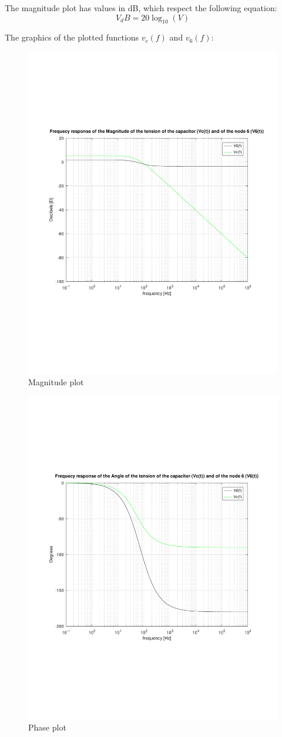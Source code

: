 The magnitude plot has values in dB, which respect the following equation:
\begin{equation}
	V_dB = 20\log_10(V)
\end{equation}

The graphics of the plotted functions $v_c(f)$ and $v_6(f)$:


\begin{figure}[h!] \centering
\includegraphics[width=0.6\linewidth]{magnitude_response.pdf}
\caption{Magnitude plot}
\label{fig:rc4}
\end{figure}



\begin{figure}[h!] \centering
\includegraphics[width=0.6\linewidth]{angle_response.pdf}
\caption{Phase plot}
\label{fig:rc5}
\end{figure}


